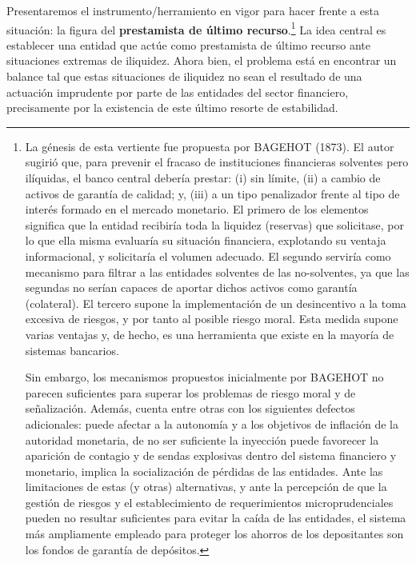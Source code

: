 \documentclass[10pt,a4paper]{article}
\begin{document}
Presentaremos el instrumento/herramiento en vigor para hacer frente a esta situación: la figura del \textbf{prestamista de último recurso}.\footnote{%
    La génesis de esta vertiente fue propuesta por BAGEHOT (1873). El autor sugirió que, para prevenir el fracaso de instituciones financieras solventes pero ilíquidas, el banco central debería prestar: (i) sin límite, (ii) a cambio de activos de garantía de calidad; y, (iii) a un tipo penalizador frente al tipo de interés formado en el mercado monetario. El primero de los elementos significa que la entidad recibiría toda la liquidez (reservas) que solicitase, por lo que ella misma evaluaría su situación financiera, explotando su ventaja informacional, y solicitaría el volumen adecuado. El segundo serviría como mecanismo para filtrar a las entidades solventes de las no-solventes, ya que las segundas no serían capaces de aportar dichos activos como garantía (colateral). El tercero supone la implementación de un desincentivo a la toma excesiva de riesgos, y por tanto al posible riesgo moral. Esta medida supone varias ventajas y, de hecho, es una herramienta que existe en la mayoría de sistemas bancarios. 

Sin embargo, los mecanismos propuestos inicialmente por BAGEHOT no parecen suficientes para superar los problemas de riesgo moral y de señalización. Además, cuenta entre otras con los siguientes defectos adicionales: puede afectar a la autonomía y a los objetivos de inflación de la autoridad monetaria, de no ser suficiente la inyección puede favorecer la aparición de contagio y de sendas explosivas dentro del sistema financiero y monetario, implica la socialización de pérdidas de las entidades. Ante las limitaciones de estas (y otras) alternativas, y ante la percepción de que la gestión de riesgos y el establecimiento de requerimientos microprudenciales pueden no resultar suficientes para evitar la caída de las entidades, el sistema más ampliamente empleado para proteger los ahorros de los depositantes son los fondos de garantía de depósitos.
} La idea central es establecer una entidad que actúe como prestamista de último recurso ante situaciones extremas de iliquidez. Ahora bien, el problema está en encontrar un balance tal que estas situaciones de iliquidez no sean el resultado de una actuación imprudente por parte de las entidades del sector financiero, precisamente por la existencia de este último resorte de estabilidad.
\end{document}
